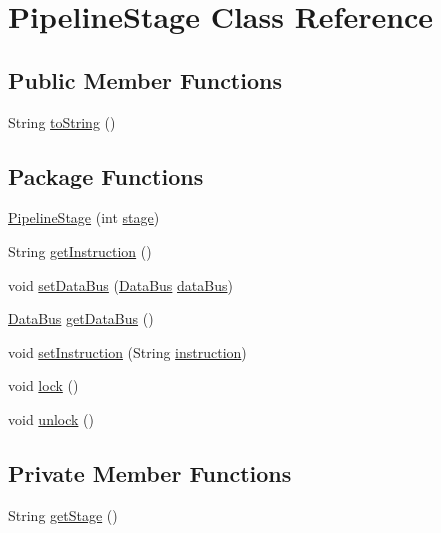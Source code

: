 \hypertarget{class_pipeline_stage}{}\section{Pipeline\+Stage Class Reference}
\label{class_pipeline_stage}
\subsection*{Public Member Functions}
\begin{DoxyCompactItemize}
\item 
String \mbox{\hyperlink{class_pipeline_stage_afe1a4701506f8257e53caff512af905d}{to\+String}} ()
\end{DoxyCompactItemize}
\subsection*{Package Functions}
\begin{DoxyCompactItemize}
\item 
\mbox{\hyperlink{class_pipeline_stage_af608b65a2a3bb7d9fcf3d860152104a2}{Pipeline\+Stage}} (int \mbox{\hyperlink{class_pipeline_stage_a8e9a5f7315a4d88213c4ad0949048f34}{stage}})
\item 
String \mbox{\hyperlink{class_pipeline_stage_a0716fd5bf42bb11790bf8ab6568dc22d}{get\+Instruction}} ()
\item 
void \mbox{\hyperlink{class_pipeline_stage_adc91fb5b9c859a597c6a889c822edb18}{set\+Data\+Bus}} (\mbox{\hyperlink{class_data_bus}{Data\+Bus}} \mbox{\hyperlink{class_pipeline_stage_abf7e2ce98acaa474f4be90e14fda0f26}{data\+Bus}})
\item 
\mbox{\hyperlink{class_data_bus}{Data\+Bus}} \mbox{\hyperlink{class_pipeline_stage_a132fd57aa34d80eb12ac7b228d29d32e}{get\+Data\+Bus}} ()
\item 
void \mbox{\hyperlink{class_pipeline_stage_a5bf1a125f39f8fbcce67d892b67c80af}{set\+Instruction}} (String \mbox{\hyperlink{class_pipeline_stage_a489ee0d4b3d0eee31ec60b9cb24a0e36}{instruction}})
\item 
void \mbox{\hyperlink{class_pipeline_stage_a12c4e47d7abbf17c0042d4b41464fae0}{lock}} ()
\item 
void \mbox{\hyperlink{class_pipeline_stage_ade83daea8199744f2f6466f5cbd87330}{unlock}} ()
\end{DoxyCompactItemize}
\subsection*{Private Member Functions}
\begin{DoxyCompactItemize}
\item 
String \mbox{\hyperlink{class_pipeline_stage_a935e03d46a543f261995097c044fd655}{get\+Stage}} ()
\end{DoxyCompactItemize}
